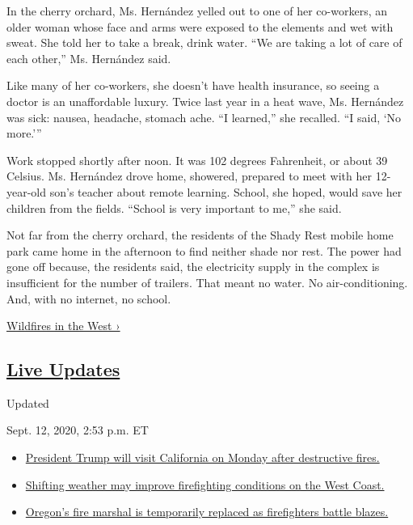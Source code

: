In the cherry orchard, Ms. Hernández yelled out to one of her
co-workers, an older woman whose face and arms were exposed to the
elements and wet with sweat. She told her to take a break, drink water.
``We are taking a lot of care of each other,'' Ms. Hernández said.

Like many of her co-workers, she doesn't have health insurance, so
seeing a doctor is an unaffordable luxury. Twice last year in a heat
wave, Ms. Hernández was sick: nausea, headache, stomach ache. ``I
learned,'' she recalled. ``I said, `No more.'''

Work stopped shortly after noon. It was 102 degrees Fahrenheit, or about
39 Celsius. Ms. Hernández drove home, showered, prepared to meet with
her 12-year-old son's teacher about remote learning. School, she hoped,
would save her children from the fields. ``School is very important to
me,'' she said.

Not far from the cherry orchard, the residents of the Shady Rest mobile
home park came home in the afternoon to find neither shade nor rest. The
power had gone off because, the residents said, the electricity supply
in the complex is insufficient for the number of trailers. That meant no
water. No air-conditioning. And, with no internet, no school.

\href{https://www.nytimes3xbfgragh.onion/spotlight/california-wildfires}{Wildfires
in the West ›}

\hypertarget{live-updates}{%
\subsection{\texorpdfstring{\href{https://www.nytimes3xbfgragh.onion/2020/09/12/us/wildfires-live-updates.html}{Live
Updates}}{Live Updates}}\label{live-updates}}

Updated~

Sept. 12, 2020, 2:53 p.m. ET

\begin{itemize}
\tightlist
\item
  \href{https://www.nytimes3xbfgragh.onion/2020/09/12/us/wildfires-live-updates.html\#link-f3961ff}{President
  Trump will visit California on Monday after destructive fires.}
\item
  \href{https://www.nytimes3xbfgragh.onion/2020/09/12/us/wildfires-live-updates.html\#link-7e503ae9}{Shifting
  weather may improve firefighting conditions on the West Coast.}
\item
  \href{https://www.nytimes3xbfgragh.onion/2020/09/12/us/wildfires-live-updates.html\#link-5e4c548d}{Oregon's
  fire marshal is temporarily replaced as firefighters battle blazes.}
\end{itemize}

